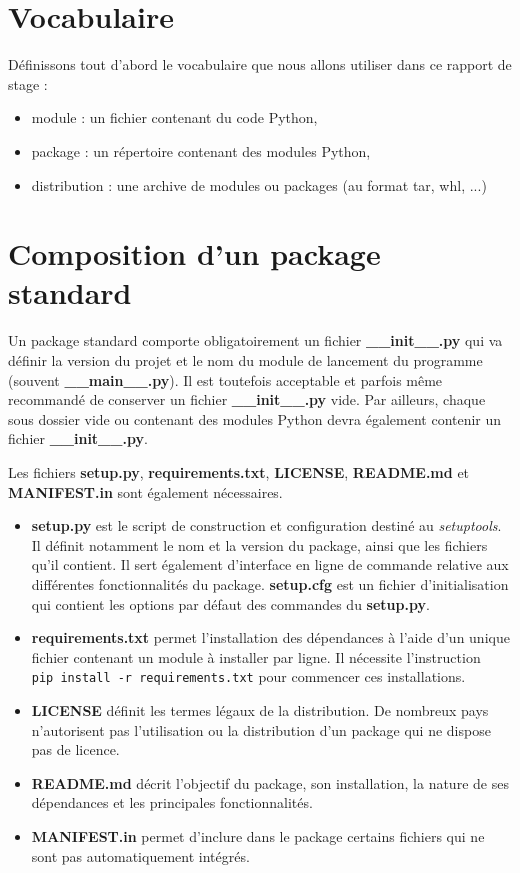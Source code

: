 \documentclass[twoside,a4paper,11pt,frenchb,openany]{report}
\begin{document}
\section{Vocabulaire}

Définissons tout d'abord le vocabulaire que nous allons utiliser dans ce rapport de stage :
\begin{itemize}
\item module : un fichier contenant du code Python,
\item package : un répertoire contenant des modules Python,
\item distribution : une archive de modules ou packages (au format tar, whl, ...)
\end{itemize}


\section{Composition d'un package standard}

Un package standard comporte obligatoirement un fichier \textbf{\_\_init\_\_.py} qui va définir la version du projet et le nom du module de lancement du programme (souvent \textbf{\_\_main\_\_.py}). Il est toutefois acceptable et parfois même recommandé de conserver un fichier \textbf{\_\_init\_\_.py} vide. Par ailleurs, chaque sous dossier vide ou contenant des modules Python devra également contenir un fichier \textbf{\_\_init\_\_.py}.

Les fichiers \textbf{setup.py}, \textbf{requirements.txt}, \textbf{LICENSE},  \textbf{README.md} et \textbf{MANIFEST.in} sont également nécessaires.  
\begin{itemize}
\item \textbf{setup.py} est le script de construction et configuration destiné au \textit{setuptools}. Il définit notamment le nom et la version du package, ainsi que les fichiers qu'il contient. Il sert également d'interface en ligne de commande relative aux différentes fonctionnalités du package. \textbf{setup.cfg} est un fichier d'initialisation qui contient les options par défaut des commandes du \textbf{setup.py}.
\item \textbf{requirements.txt} permet l'installation des dépendances à l'aide d'un unique fichier contenant un module à installer par ligne. Il nécessite l'instruction 
\texttt{  pip install -r requirements.txt}
pour commencer ces installations.
\item \textbf{LICENSE} définit les termes légaux de la distribution. De nombreux pays n'autorisent pas l'utilisation ou la distribution d'un package qui ne dispose pas de licence.
\item \textbf{README.md} décrit l'objectif du package, son installation, la nature de ses dépendances et les principales fonctionnalités.
\item \textbf{MANIFEST.in} permet d'inclure dans le package certains fichiers qui ne sont pas automatiquement intégrés. 
\end{itemize}
\end{document}
